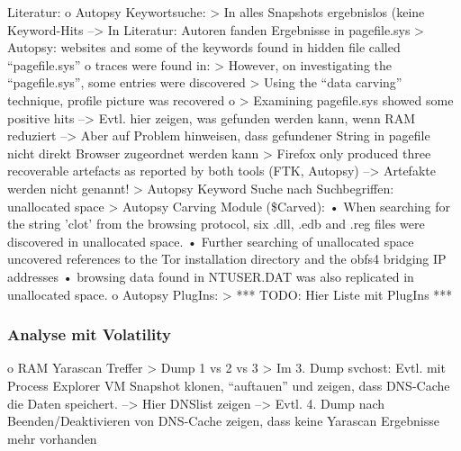 Literatur:
	o	Autopsy Keywortsuche: 
		>	In alles Snapshots ergebnislos (keine Keyword-Hits
		-->	In Literatur: Autoren fanden Ergebnisse in pagefile.sys 
			> Autopsy: websites and some of the keywords found in hidden file called “pagefile.sys” \cite{Mahlous.2020}
			o \cite{Montasari.2015} traces were found in: 
				> However, on investigating the “pagefile.sys”, some entries were discovered
				> Using the “data carving” technique, profile picture was recovered
			o \cite{Said.2011} 
				> Examining pagefile.sys showed some positive hits 			
		--> Evtl. hier zeigen, was gefunden werden kann, wenn RAM reduziert
		--> Aber auf Problem hinweisen, dass gefundener String in pagefile nicht direkt Browser zugeordnet werden kann
		> \cite{Gabet.2018}	Firefox only produced three recoverable artefacts as reported by both tools (FTK, Autopsy) --> Artefakte werden nicht genannt!
		> \cite{Muir.2019} Autopsy Keyword Suche nach Suchbegriffen: unallocated space
		> Autopsy Carving Module (\$Carved): \cite{Muir.2019}
			•	When searching for the string ’clot’ from the browsing protocol, six .dll, .edb and .reg files were discovered in unallocated space.
			•	Further searching of unallocated space uncovered references to the Tor installation directory and the obfs4 bridging IP addresses
			•	browsing data found in NTUSER.DAT was also replicated in unallocated space.
	o	Autopsy PlugIns:
		>	*** TODO: Hier Liste mit PlugIns ***

\subsubsection*{Analyse mit Volatility}
o	RAM Yarascan Treffer
	>	Dump 1 vs 2 vs 3 
	>	Im 3. Dump svchost: Evtl. mit Process Explorer VM Snapshot klonen, “auftauen” und zeigen, dass DNS-Cache die Daten speichert. 
	-->	Hier DNSlist zeigen
	-->	Evtl. 4. Dump nach Beenden/Deaktivieren von DNS-Cache zeigen, dass keine Yarascan Ergebnisse mehr vorhanden

